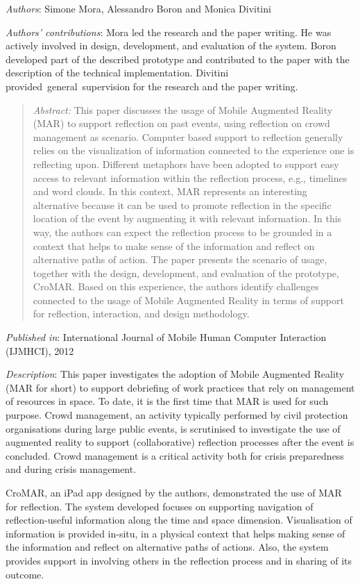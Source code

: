 \emph{Authors}: Simone Mora, Alessandro Boron and Monica Divitini

\emph{Authors' contributions}: Mora led the research and the paper writing. He was actively involved in design, development, and evaluation of the system. Boron developed part of the described prototype and contributed to the paper with the description of the technical implementation. Divitini provided~general~supervision for the research and the paper writing.
\begin{quote}
	\emph{Abstract:} This paper discusses the usage of Mobile Augmented Reality (MAR) to support reflection on past events, using reflection on crowd management as scenario. Computer based support to reflection generally relies on the visualization of information connected to the experience one is reflecting upon. Different metaphors have been adopted to support easy access to relevant information within the reflection process, e.g., timelines and word clouds. In this context, MAR represents an interesting alternative because it can be used to promote reflection in the specific location of the event by augmenting it with relevant information. In this way, the authors can expect the reflection process to be grounded in a context that helps to make sense of the information and reflect on alternative paths of action. The paper presents the scenario of usage, together with the design, development, and evaluation of the prototype, CroMAR. Based on this experience, the authors identify challenges connected to the usage of Mobile Augmented Reality in terms of support for reflection, interaction, and design methodology. 
\end{quote}

\emph{Published in}: International Journal of Mobile Human Computer Interaction (IJMHCI), 2012

\emph{Description}: This paper investigates the adoption of Mobile Augmented Reality (MAR for short) to support debriefing of work practices that rely on management of resources in space. To date, it is the first time that MAR is used for such purpose. Crowd management, an activity typically performed by civil protection organisations during large public events, is scrutinised to investigate the use of augmented reality to support (collaborative) reflection processes after the event is concluded. Crowd management is a critical activity both for crisis preparedness and during crisis management.

CroMAR, an iPad app designed by the authors, demonstrated the use of MAR for reflection. The system developed focuses on supporting navigation of reflection-useful information along the time and space dimension. Visualisation of information is provided in-situ, in a physical context that helps making sense of the information and reflect on alternative paths of actions. Also, the system provides support in involving others in the reflection process and in sharing of its outcome.

